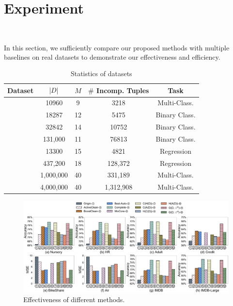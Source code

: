 
\section{Experiment}~\label{sec:exp}


In this section, we sufficiently compare our proposed methods with multiple baselines on real datasets to demonstrate our effectiveness and efficiency. 

\begin{table}
	\centering
	\caption{Statistics of datasets}
	\vspace{-1em}
	{\small
	\begin{tabular}{ccccc}
		\hline
		{\bf Dataset} & {\bf $|D|$} & {\bf $M$} & {\bf $\#$ Incomp. Tuples} & {\bf Task}\\
		\hline	
		\nursery & 	10960 & 9 & 3218 & Multi-Class. \\
		\hr & 18287 & 12 & 5475 & Binary Class. \\
		\adult & 32842 & 14 & 10752 & Binary Class. \\
		\credit & 131,000 & 11 & 76813 & Binary Class. \\
		\bike & 13300 & 15 & 4821 & Regression \\
		\air & 437,200  & 18 & 128,372 & Regression\\
		\imdb & 1,000,000 & 40 & 331,189 & Multi-Class.\\
		\imdbl & 4,000,000 & 40 & 1,312,908 & Multi-Class.\\
		\hline
	\end{tabular}
	}
	\label{tbl:dataset}
\end{table}



\begin{figure}
	\centering
	\includegraphics[width=\textwidth]{figs/effectiveness_old.pdf}
	\caption{Effectiveness of different methods.}
	\label{fig:effectiveness_old}
\end{figure}

